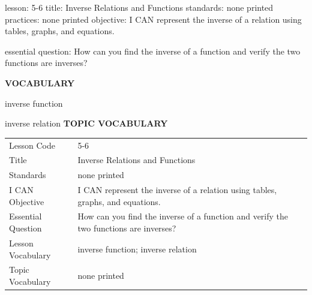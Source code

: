 \documentclass{article}
\newenvironment{lesson-meta}{}{}        %
\newcommand{\te}[1]{}                   %
\begin{document}
\begin{lesson-meta}
lesson: 5-6
title: Inverse Relations and Functions
standards: none printed
practices: none printed
objective: I CAN represent the inverse of a relation using tables, graphs, and equations.

essential question: How can you find the inverse of a function and verify the two functions are inverses?

\textbf{VOCABULARY}
\item inverse function
\item inverse relation
\textbf{TOPIC VOCABULARY}
\te{No topic vocabulary list is printed on these pages.}
\begin{tabular}{ll}
Lesson Code & 5-6 \\
Title & Inverse Relations and Functions \\
Standards & none printed \\
I CAN Objective & I CAN represent the inverse of a relation using tables, graphs, and equations. \\
Essential Question & How can you find the inverse of a function and verify the two functions are inverses? \\
Lesson Vocabulary & inverse function; inverse relation \\
Topic Vocabulary & none printed \\
\end{tabular}
\end{lesson-meta}
\end{document}
